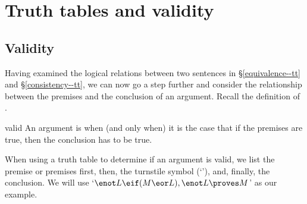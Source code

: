 \graphicspath{{figures--tt/}}


\chapter{Truth tables and validity}\label{c:tt-validity}

\section{Validity}\label{s:tt-validity}

Having examined the logical relations between two sentences in \S\ref{equivalence--tt} and \S\ref{consistency--tt}, we can now go a step further and consider the relationship between the premises and the conclusion of an argument. 
Recall the definition of . 
\begin{factboxy}{valid}
An argument is  when (and only when) it is the case that if the premises are true, then the conclusion has to be true.
\end{factboxy}




When using a truth table to determine if an argument is valid, we list the premise or premises first, then, the turnstile symbol (`\proves'), and, finally, the conclusion. We will use `$\enot L \eif (M \eor L), \enot L \proves M$' as our example. 

